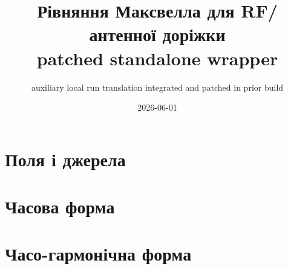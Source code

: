 \documentclass[11pt,a4paper]{article}
\title{Рівняння Максвелла для RF/антенної доріжки\\\large patched standalone wrapper}
\author{auxiliary local run translation integrated and patched in prior build}
\date{2026-06-01}
\begin{document}
\maketitle
\section*{Поля і джерела}

\section*{Часова форма}

\section*{Часо-гармонічна форма}

\end{document}
